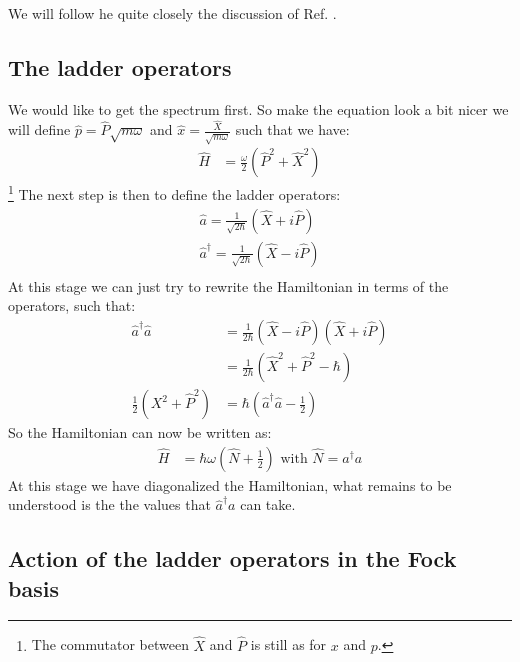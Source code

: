 \documentclass[10pt]{article}
\let\cite\citep
\providecommand\citep{\cite}
\begin{document}
We will follow he quite closely the discussion of Ref. \cite{interactions}.

\subsection{The ladder operators}
We would like to get the spectrum first. So make the equation look a bit nicer we will define $\hat{p} = \hat{P} \sqrt{m\omega}$ and $\hat{x} = \frac{\hat{X}}{\sqrt{m\omega}}$ such that we have:
\begin{align}\label{Eq:HamHO}
\hat{H} &= \frac{\omega}{2}\left(\hat{P}^2 + \hat{X}^2\right)
\end{align}
\footnote{The commutator between $\hat{X}$ and $\hat{P}$ is still as for $x$ and $p$.} The next step is then to define the ladder operators:
\begin{align}
\hat{a} = \frac{1}{\sqrt{2\hbar}}\left(\hat{X}+i\hat{P}\right)\\
\hat{a}^\dag = \frac{1}{\sqrt{2\hbar}}\left(\hat{X}-i\hat{P}\right)\\
\end{align}
At this stage we can just try to rewrite the Hamiltonian in terms of the operators, such that:
\begin{align}
\hat{a}^\dag \hat{a} &= \frac{1}{2\hbar}(\hat{X}-i\hat{P})(\hat{X}+i\hat{P})\\
&= \frac{1}{2\hbar}(\hat{X}^2 +\hat{P}^2 -\hbar)\\
 \frac{1}{2}(X^2 +\hat{P}^2 ) &= \hbar \left(\hat{a}^\dag \hat{a}-\frac{1}{2}\right)
\end{align}
So the Hamiltonian can now be written as:
\begin{align}
\hat{H} &= \hbar \omega \left(\hat{N} + \frac{1}{2}\right)\text{ with } \hat{N} = a^\dag a
\end{align}
At this stage we have diagonalized the Hamiltonian, what remains to be understood is the the values that $\hat{a}^\dag a$ can take.

\subsection{Action of the ladder operators in the Fock basis}
\end{document}

